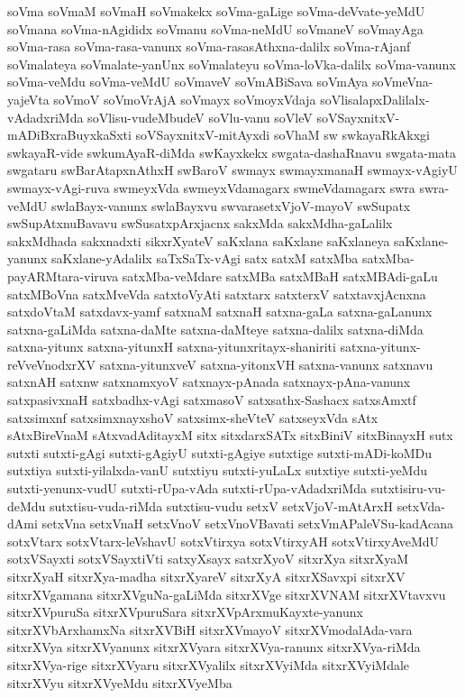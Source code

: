 {soVma
soVmaM
soVmaH
soVmakekx
soVma-gaLige
soVma-deVvate-yeMdU
soVmana
soVma-nAgididx
soVmanu
soVma-neMdU
soVmaneV
soVmayAga
soVma-rasa
soVma-rasa-vanunx
soVma-rasasAthxna-dalilx
soVma-rAjanf
soVmalateya
soVmalate-yanUnx
soVmalateyu
soVma-loVka-dalilx
soVma-vanunx
soVma-veMdu
soVma-veMdU
soVmaveV
soVmABiSava
soVmAya
soVmeVna-yajeVta
soVmoV
soVmoVrAjA
soVmayx
soVmoyxVdaja
soVlisalapxDalilalx-vAdadxriMda
soVlisu-vudeMbudeV
soVlu-vanu
soVleV
soVSayxnitxV-mADiBxraBuyxkaSxti
soVSayxnitxV-mitAyxdi
soVhaM
sw
swkayaRkAkxgi
swkayaR-vide
swkumAyaR-diMda
swKayxkekx
swgata-dashaRnavu
swgata-mata
swgataru
swBarAtapxnAthxH
swBaroV
swmayx
swmayxmanaH
swmayx-vAgiyU
swmayx-vAgi-ruva
swmeyxVda
swmeyxVdamagarx
swmeVdamagarx
swra
swra-veMdU
swlaBayx-vanunx
swlaBayxvu
swvarasetxVjoV-mayoV
swSupatx
swSupAtxnuBavavu
swSusatxpArxjacnx
sakxMda
sakxMdha-gaLalilx
sakxMdhada
sakxnadxti
sikxrXyateV
saKxlana
saKxlane
saKxlaneya
saKxlane-yanunx
saKxlane-yAdalilx
saTxSaTx-vAgi
satx
satxM
satxMba
satxMba-payARMtara-viruva
satxMba-veMdare
satxMBa
satxMBaH
satxMBAdi-gaLu
satxMBoVna
satxMveVda
satxtoVyAti
satxtarx
satxterxV
satxtavxjAcnxna
satxdoVtaM
satxdavx-yamf
satxnaM
satxnaH
satxna-gaLa
satxna-gaLanunx
satxna-gaLiMda
satxna-daMte
satxna-daMteye
satxna-dalilx
satxna-diMda
satxna-yitunx
satxna-yitunxH
satxna-yitunxritayx-shaniriti
satxna-yitunx-reVveVnodxrXV
satxna-yitunxveV
satxna-yitonxVH
satxna-vanunx
satxnavu
satxnAH
satxnw
satxnamxyoV
satxnayx-pAnada
satxnayx-pAna-vanunx
satxpasivxnaH
satxbadhx-vAgi
satxmasoV
satxsathx-Sashacx
satxsAmxtf
satxsimxnf
satxsimxnayxshoV
satxsimx-sheVteV
satxseyxVda
sAtx
sAtxBireVnaM
sAtxvadAditayxM
sitx
sitxdarxSATx
sitxBiniV
sitxBinayxH
sutx
sutxti
sutxti-gAgi
sutxti-gAgiyU
sutxti-gAgiye
sutxtige
sutxti-mADi-koMDu
sutxtiya
sutxti-yilalxda-vanU
sutxtiyu
sutxti-yuLaLx
sutxtiye
sutxti-yeMdu
sutxti-yenunx-vudU
sutxti-rUpa-vAda
sutxti-rUpa-vAdadxriMda
sutxtisiru-vu-deMdu
sutxtisu-vuda-riMda
sutxtisu-vudu
setxV
setxVjoV-mAtArxH
setxVda-dAmi
setxVna
setxVnaH
setxVnoV
setxVnoVBavati
setxVmAPaleVSu-kadAcana
sotxVtarx
sotxVtarx-leVshavU
sotxVtirxya
sotxVtirxyAH
sotxVtirxyAveMdU
sotxVSayxti
sotxVSayxtiVti
satxyXsayx
satxrXyoV
sitxrXya
sitxrXyaM
sitxrXyaH
sitxrXya-madha
sitxrXyareV
sitxrXyA
sitxrXSavxpi
sitxrXV
sitxrXVgamana
sitxrXVguNa-gaLiMda
sitxrXVge
sitxrXVNAM
sitxrXVtavxvu
sitxrXVpuruSa
sitxrXVpuruSara
sitxrXVpArxmuKayxte-yanunx
sitxrXVbArxhamxNa
sitxrXVBiH
sitxrXVmayoV
sitxrXVmodalAda-vara
sitxrXVya
sitxrXVyanunx
sitxrXVyara
sitxrXVya-ranunx
sitxrXVya-riMda
sitxrXVya-rige
sitxrXVyaru
sitxrXVyalilx
sitxrXVyiMda
sitxrXVyiMdale
sitxrXVyu
sitxrXVyeMdu
sitxrXVyeMba
}
